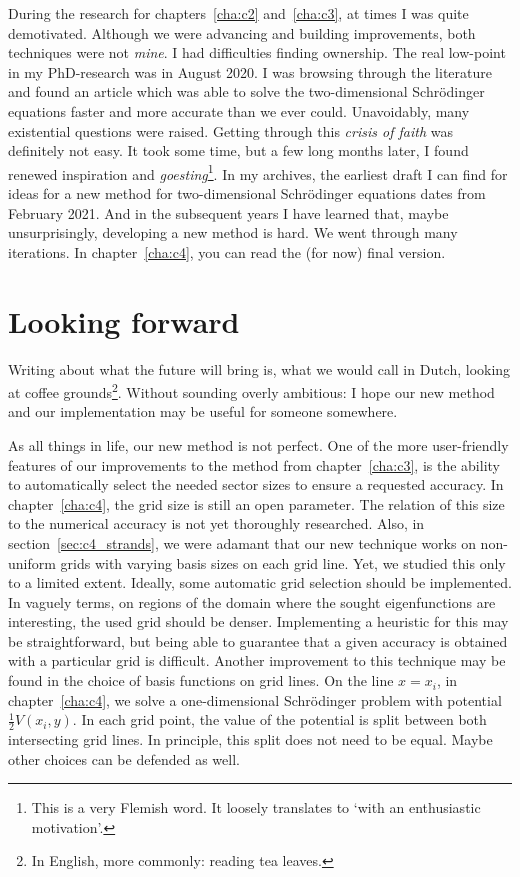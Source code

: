 During the research for chapters~\ref{cha:c2} and~\ref{cha:c3}, at times I was quite demotivated. Although we were advancing and building improvements, both techniques were not \emph{mine}. I had difficulties finding ownership. The real low-point in my PhD-research was in August 2020. I was browsing through the literature and found an article which was able to solve the two-dimensional Schrödinger equations faster and more accurate than we ever could. Unavoidably, many existential questions were raised. Getting through this \emph{crisis of faith} was definitely not easy. It took some time, but a few long months later, I found renewed inspiration and \emph{goesting}\footnote{This is a very Flemish word. It loosely translates to `with an enthusiastic motivation'.}. In my archives, the earliest draft I can find for ideas for a new method for two-dimensional Schrödinger equations dates from February 2021. And in the subsequent years I have learned that, maybe unsurprisingly, developing a new method is hard. We went through many iterations. In chapter~\ref{cha:c4}, you can read the (for now) final version.


\section*{Looking forward}

Writing about what the future will bring is, what we would call in Dutch, looking at coffee grounds\footnote{In English, more commonly: reading tea leaves.}. Without sounding overly ambitious: I hope our new method and our implementation may be useful for someone somewhere.

As all things in life, our new method is not perfect. One of the more user-friendly features of our improvements to the method from chapter~\ref{cha:c3}, is the ability to automatically select the needed sector sizes to ensure a requested accuracy. In chapter~\ref{cha:c4}, the grid size is still an open parameter. The relation of this size to the numerical accuracy is not yet thoroughly researched. Also, in section~\ref{sec:c4_strands}, we were adamant that our new technique works on non-uniform grids with varying basis sizes on each grid line. Yet, we studied this only to a limited extent. Ideally, some automatic  grid selection should be implemented. In vaguely terms, on regions of the domain where the sought eigenfunctions are interesting, the used grid should be denser. Implementing a heuristic for this may be straightforward, but being able to guarantee that a given accuracy is obtained with a particular grid is difficult. Another improvement to this technique may be found in the choice of basis functions on grid lines. On the line $x = x_i$, in chapter~\ref{cha:c4}, we solve a one-dimensional Schrödinger problem with potential $\frac{1}{2} V(x_i, y)$. In each grid point, the value of the potential is split between both intersecting grid lines. In principle, this split does not need to be equal. Maybe other choices can be defended as well.

